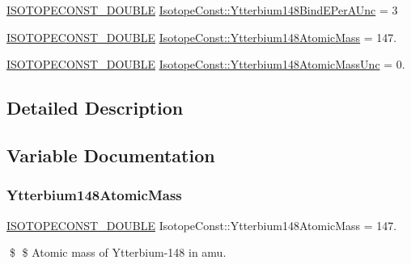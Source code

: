 \begin{DoxyCompactItemize}
\mbox{\hyperlink{group___isotope_const-_macros_ga8f45a7272ce02c0b4c65c44636ed719a}{I\+S\+O\+T\+O\+P\+E\+C\+O\+N\+S\+T\+\_\+\+D\+O\+U\+B\+LE}} \mbox{\hyperlink{group___isotope_const-_ytterbium-_yb148_ga84d6c0f1f6c9d4eb5204024768b744cd}{Isotope\+Const\+::\+Ytterbium148\+Bind\+E\+Per\+A\+Unc}} = 3
\item 
\mbox{\hyperlink{group___isotope_const-_macros_ga8f45a7272ce02c0b4c65c44636ed719a}{I\+S\+O\+T\+O\+P\+E\+C\+O\+N\+S\+T\+\_\+\+D\+O\+U\+B\+LE}} \mbox{\hyperlink{group___isotope_const-_ytterbium-_yb148_ga9e54cdfacc6dcaf2aecaa3b6ae7aad9b}{Isotope\+Const\+::\+Ytterbium148\+Atomic\+Mass}} = 147.
\item 
\mbox{\hyperlink{group___isotope_const-_macros_ga8f45a7272ce02c0b4c65c44636ed719a}{I\+S\+O\+T\+O\+P\+E\+C\+O\+N\+S\+T\+\_\+\+D\+O\+U\+B\+LE}} \mbox{\hyperlink{group___isotope_const-_ytterbium-_yb148_gaa01fbfad33f4ea79c1de1569b104bbc8}{Isotope\+Const\+::\+Ytterbium148\+Atomic\+Mass\+Unc}} = 0.
\end{DoxyCompactItemize}


\subsection{Detailed Description}


\subsection{Variable Documentation}
\mbox{\label{group___isotope_const-_ytterbium-_yb148_ga9e54cdfacc6dcaf2aecaa3b6ae7aad9b}} 
\subsubsection{\texorpdfstring{Ytterbium148\+Atomic\+Mass}{Ytterbium148AtomicMass}}
{\footnotesize\ttfamily \mbox{\hyperlink{group___isotope_const-_macros_ga8f45a7272ce02c0b4c65c44636ed719a}{I\+S\+O\+T\+O\+P\+E\+C\+O\+N\+S\+T\+\_\+\+D\+O\+U\+B\+LE}} Isotope\+Const\+::\+Ytterbium148\+Atomic\+Mass = 147.}

\$ \$ Atomic mass of Ytterbium-\/148 in amu. \mbox{\label{group___isotope_const-_ytterbium-_yb148_gaa01fbfad33f4ea79c1de1569b104bbc8}} 
